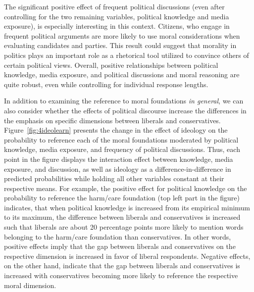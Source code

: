 \documentclass[12pt]{article}
\begin{document}
The significant positive effect of frequent political discussions (even after controlling for the two remaining variables, political knowledge and media exposure), is especially interesting in this context. Citizens, who engage in frequent political arguments are more likely to use moral considerations when evaluating candidates and parties. This result could suggest that morality in politics plays an important role as a rhetorical tool utilized to convince others of certain political views. Overall, positive relationships between political knowledge, media exposure, and political discussions and moral reasoning are quite robust, even while controlling for individual response lengths.

In addition to examining the reference to moral foundations \textit{in general}, we can also consider whether the effects of political discourse increase the differences in the emphasis on specific dimensions between liberals and conservatives. Figure~\ref{fig:4ideolearn} presents the change in the effect of ideology on the probability to reference each of the moral foundations moderated by political knowledge, media exposure, and frequency of political discussions. Thus, each point in the figure displays the interaction effect between knowledge, media exposure, and discussion, as well as ideology as a difference-in-difference in predicted probabilities while holding all other variables constant at their respective means. For example, the positive effect for political knowledge on the probability to reference the harm/care foundation (top left part in the figure) indicates, that when political knowledge is increased from its empirical minimum to its maximum, the difference between liberals and conservatives is increased such that liberals are about 20 percentage points more likely to mention words belonging to the harm/care foundation than conservatives. In other words, positive effects imply that the gap between liberals and conservatives on the respective dimension is increased in favor of liberal respondents. Negative effects, on the other hand, indicate that the gap between liberals and conservatives is increased with conservatives becoming more likely to reference the respective moral dimension.
\end{document}
